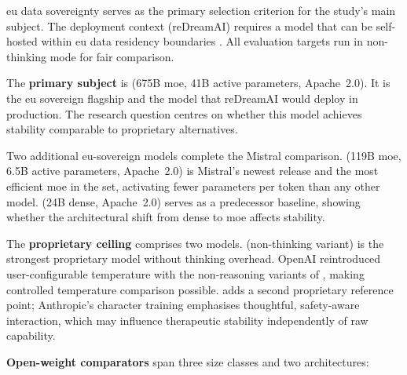 \gls{eu} data sovereignty serves as the primary selection criterion for the
study's main subject. The deployment context (reDreamAI) requires a model
that can be self-hosted within \gls{eu} data residency boundaries
\parencite{2QMKF3RM}. All evaluation targets run in non-thinking mode for
fair comparison.

The \textbf{primary subject} is 
(675B \gls{moe}, 41B active parameters, Apache~2.0). It is the \gls{eu}
sovereign flagship and the model that reDreamAI would deploy in production.
The research question centres on whether this model achieves stability
comparable to proprietary alternatives.

Two additional \gls{eu}-sovereign models complete the Mistral comparison.
 (119B \gls{moe}, 6.5B active parameters,
Apache~2.0) is Mistral's newest release and the most efficient \gls{moe}
in the set, activating fewer parameters per token than any other model.
 (24B dense, Apache~2.0) serves as a
predecessor baseline, showing whether the architectural shift from dense to
\gls{moe} affects stability.

The \textbf{proprietary ceiling} comprises two models.
 (non-thinking variant) is the strongest proprietary
model without thinking overhead. OpenAI reintroduced user-configurable
temperature with the non-reasoning variants of ,
making controlled temperature comparison possible.
 adds a second proprietary reference point;
Anthropic's character training emphasises thoughtful, safety-aware
interaction, which may influence therapeutic stability independently of raw
capability.

\textbf{Open-weight comparators} span three size classes and two
architectures:

